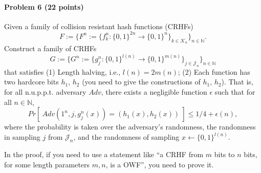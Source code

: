 \paragraph{Problem 6 (22 points)}

Given a family of collision resistant hash functions (CRHFs) 
\[ F:=\{ F^n:=\{ f^n_k: \{0,1\}^{2n} \to \{0,1\}^n  \}_{k\in \mathcal{K}_n} \}_{n\in\mathbb{N}}.\] 
Construct a family of CRHFs 
\[ G:=\{ G^n:=\{ g^n_j: \{0,1\}^{l(n)} \to \{0,1\}^{m(n)} \}_{j\in \mathcal{J}_n} \}_{n\in\mathbb{N}}\] that satisfies
(1) Length halving, i.e., $l(n) = 2m(n)$; 
(2) Each function has two hardcore bits $h_1$, $h_2$ (you need to give the constructions of $h_1$, $h_2$). That is, for all n.u.p.p.t. adversary $Adv$, there exists a negligible function $\epsilon$ such that for all $n\in \mathbb{N}$, 
\[ Pr[ ~ Adv(1^n, j, g^n_j( x )) = (h_1(x), h_2(x)) ~ ] \leq 1/4+\epsilon(n), \]
where the probability is taken over the adversary's randomness, the randomness in sampling $j$ from $\mathcal{J}_n$, and the randomness of sampling $x\leftarrow \{0,1\}^{l(n)}$. 

In the proof, if you need to use a statement like ``a CRHF from $m$ bits to $n$ bits, for some length parameters $m,n$, is a OWF'', you need to prove it.
